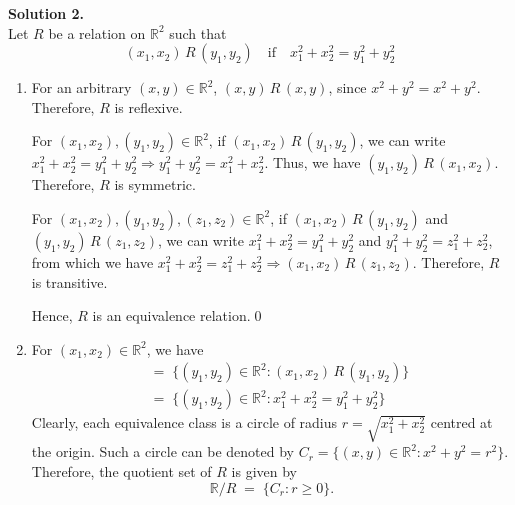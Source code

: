 \documentclass[10pt]{article}
\begin{document}
        \textbf{Solution 2.}\\
        Let $R$ be a relation on $\mathbb{R}^2$ such that
        \[(x_1, x_2)\,R\,(y_1, y_2) \quad\text{if}\quad x_1^2 + x_2^2 = y_1^2 + y_2^2\]

        \begin{enumerate}
                \item For an arbitrary $(x, y) \in \mathbb{R}^2$, $(x, y)\,R\,(x, y)$, since $x^2 + y^2 = x^2 + y^2$. Therefore, $R$
                is reflexive.

                For $(x_1, x_2), (y_1, y_2) \in \mathbb{R}^2$, if $(x_1, x_2)\,R\,(y_1, y_2)$, we can write 
                $x_1^2 + x_2^2 = y_1^2 + y_2^2 \Rightarrow y_1^2 + y_2^2 = x_1^2 + x_2^2$. Thus, we have $(y_1, y_2)\,R\,(x_1, x_2)$.
                Therefore, $R$ is symmetric.

                For $(x_1, x_2), (y_1, y_2), (z_1, z_2) \in \mathbb{R}^2$, if $(x_1, x_2)\,R\,(y_1, y_2)$ and $(y_1, y_2)\,R\,(z_1, z_2)$,
                we can write $x_1^2 + x_2^2 = y_1^2 + y_2^2$ and $y_1^2 + y_2^2 = z_1^2 + z_2^2$, from which we have
                $x_1^2 + x_2^2 = z_1^2 + z_2^2 \Rightarrow (x_1, x_2)\,R\,(z_1, z_2)$. Therefore, $R$ is transitive.

                Hence, $R$ is an equivalence relation.\qed
                
                \item For $(x_1, x_2) \in \mathbb{R}^2$, we have
                \begin{align*}
                [(x_1, x_2)] \;&=\; \{(y_1, y_2) \in \mathbb{R}^2 : (x_1, x_2)\,R\,(y_1, y_2)\} \\
                        \;&=\; \{(y_1, y_2) \in \mathbb{R}^2 : x_1^2 + x_2^2 = y_1^2 + y_2^2\}
                \end{align*}
                Clearly, each equivalence class is a circle of radius $r = \sqrt{x_1^2 + x_2^2}$ centred at the origin.
                Such a circle can be denoted by $C_r = \{(x, y) \in \mathbb{R}^2 : x^2 + y^2 = r^2\}$.
                Therefore, the quotient set of $R$ is given by $$\mathbb{R}/R \;=\; \{C_r : r \geq 0\}.$$
                
        \end{enumerate}
\end{document}
